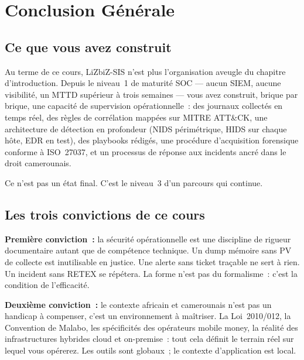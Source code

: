 \chapter*{Conclusion Générale}
\label{chap:conclusion}

\section*{Ce que vous avez construit}

Au terme de ce cours, LiZbiZ-SIS n'est plus l'organisation aveugle du
chapitre d'introduction. Depuis le niveau~1 de maturité SOC — aucun
SIEM, aucune visibilité, un MTTD supérieur à trois semaines — vous avez
construit, brique par brique, une capacité de supervision opérationnelle~:
des journaux collectés en temps réel, des règles de corrélation mappées
sur MITRE ATT\&CK, une architecture de détection en profondeur (NIDS
périmétrique, HIDS sur chaque hôte, EDR en test), des playbooks rédigés,
une procédure d'acquisition forensique conforme à ISO~27037, et un
processus de réponse aux incidents ancré dans le droit camerounais.

Ce n'est pas un état final. C'est le niveau~3 d'un parcours qui continue.

\section*{Les trois convictions de ce cours}

\textbf{Première conviction~:} la sécurité opérationnelle est une
discipline de rigueur documentaire autant que de compétence technique.
Un dump mémoire sans PV de collecte est inutilisable en justice.
Une alerte sans ticket traçable ne sert à rien. Un incident sans RETEX
se répétera. La forme n'est pas du formalisme~: c'est la condition
de l'efficacité.

\textbf{Deuxième conviction~:} le contexte africain et camerounais
n'est pas un handicap à compenser, c'est un environnement à maîtriser.
La Loi~2010/012, la Convention de Malabo, les spécificités des opérateurs
mobile money, la réalité des infrastructures hybrides cloud et on-premise~:
tout cela définit le terrain réel sur lequel vous opérerez. Les outils
sont globaux~; le contexte d'application est local.

